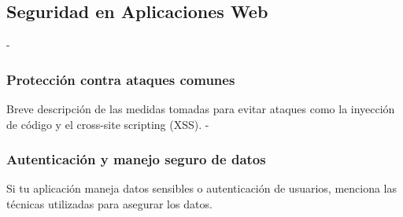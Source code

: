 \subsection{Seguridad en Aplicaciones Web}
- \subsubsection{Protección contra ataques comunes}
Breve descripción de las medidas tomadas para evitar ataques como la inyección de código y el cross-site scripting (XSS).
- \subsubsection{Autenticación y manejo seguro de datos}
Si tu aplicación maneja datos sensibles o autenticación de usuarios, menciona las técnicas utilizadas para asegurar los datos.



%
%
